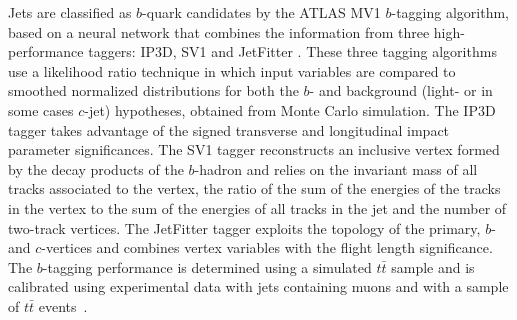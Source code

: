 Jets are classified as $b$-quark candidates by the ATLAS MV1 $b$-tagging algorithm, based on a neural network that combines the information from three high-performance taggers: IP3D, SV1 and JetFitter \cite{ATLAS-CONF-2011-102}.  These three tagging algorithms use a likelihood ratio technique in which input variables are compared to smoothed normalized distributions for both the $b$- and background (light- or in some cases $c$-jet) hypotheses, obtained from Monte Carlo simulation.  The IP3D tagger takes advantage of the signed transverse and longitudinal impact parameter significances. The SV1 tagger reconstructs an inclusive vertex formed by the decay products of the $b$-hadron and relies on the invariant mass of all tracks associated to the vertex, the ratio of the sum of the energies of the tracks in the vertex to the sum of the energies of all tracks in the jet and the number of two-track vertices. The JetFitter tagger exploits the topology of the primary, $b$- and $c$-vertices and combines vertex variables with the flight length significance.  The $b$-tagging performance is determined using a simulated $t\bar{t}$ sample and is calibrated using experimental data with jets containing muons and with a sample of $t\bar{t}$ events~\cite{ATLAS-CONF-2011-089}.


